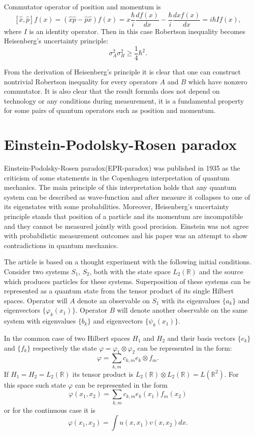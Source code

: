 \documentclass[11pt]{article}
\begin{document}
Commutator operator of position and momentum is 
\[
[\hat{x}, \hat{p}]f(x) = (\hat{x}\hat{p} - \hat{p}\hat{x})f(x) = x\frac{\hbar}{i}\frac{df(x)}{dx} - \frac{\hbar}{i}\frac{d xf(x)}{dx} = i\hbar If(x),
\]
where $I$ is an identity operator. Then in this case Robertson inequality becomes Heisenberg's uncertainty principle:
\[
\sigma_A^2\sigma_B^2 \geq \frac{1}{4}\hbar^2.
\]

From the derivation of Heisenberg's principle it is clear that one can construct nontrivial Robertson inequality for every operators $A$ and $B$ which have nonzero commutator. It is also clear that the result formula does not depend on technology or any conditions during measurement, it is a fundamental property for some pairs of quantum operators such as position and momentum.

\section{Einstein-Podolsky-Rosen paradox}
Einstein-Podolsky-Rosen paradox(EPR-paradox) was published in 1935 as the criticism of some statements in the Copenhagen interpretation of quantum mechanics. The main principle of this interpretation holds that any quantum system can be described as wave-function and after measure it collapses to one of its eigenstates with some probabilities. Moreover, Heisenberg's uncertainty principle stands that position of a particle and its momentum are incompatible and they cannot be measured jointly with good precision. Einstein was not agree with probabilistic measurement outcomes and his paper was an attempt to show contradictions in quantum mechanics.

The article is based on a thought experiment with the following initial conditions. Consider two systems $S_1$, $S_2$, both with the state space $L_2(\mathbb{R})$ and the source which produces particles for these systems. Superposition of these systems can be represented as a quantum state from the tensor product of its single Hilbert spaces.
Operator will $A$ denote an observable on $S_1$ with its eigenvalues $\{a_k\}$ and eigenvectors $\{\varphi_k(x_1)\}$. Operator $B$ will denote another observable on the same system with eigenvalues $\{b_k\}$ and eigenvectors $\{\psi_k(x_1)\}$. 

In the common case of two Hilbert spaces $H_1$ and $H_2$ and their basis vectors $\{e_k\}$ and $\{f_k\}$ respectively the state $\varphi = \varphi_1\otimes\varphi_2$ can be represented in the form:
\[
\varphi = \sum_{k, m}c_{k, m}e_k\otimes f_m.
\]
If $H_1 = H_2 = L_2(\mathbb{R})$ its tensor product is $L_2(\mathbb{R})\otimes L_2(\mathbb{R}) = L(\mathbb{R}^2)$. For this space such state $\varphi$ can be represented in the form
\[
\varphi (x_1, x_2) = \sum_{k, m}c_{k, m}e_k(x_1)f_m(x_2)
\]
or for the continuous case it is
\[
\varphi (x_1, x_2) = \int u(x, x_1)v(x, x_2)dx.
\]
\end{document}
